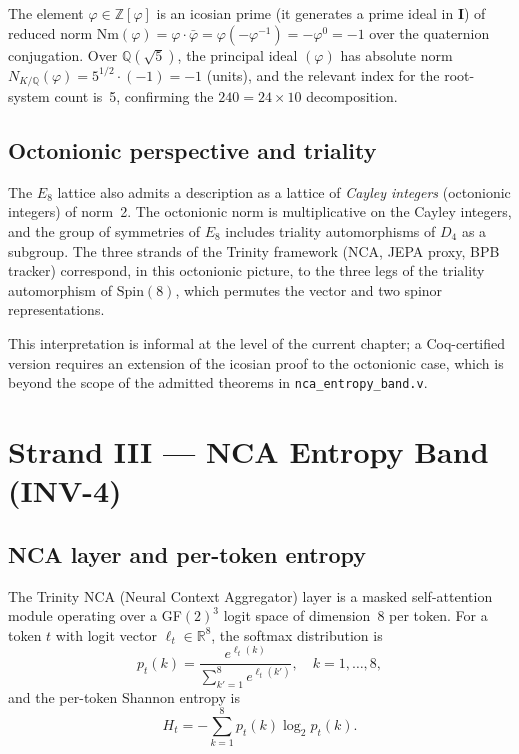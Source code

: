 The element \(\varphi \in \mathbb{Z}[\varphi]\) is an icosian prime
(it generates a prime ideal in \(\mathbf{I}\)) of reduced norm
\(\mathrm{Nm}(\varphi) = \varphi \cdot \bar{\varphi} = \varphi(-\varphi^{-1})
= -\varphi^0 = -1\) over the quaternion conjugation.  Over
\(\mathbb{Q}(\sqrt{5})\), the principal ideal \((\varphi)\) has
absolute norm \(N_{K/\mathbb{Q}}(\varphi) = 5^{1/2} \cdot (-1) = -1\)
(units), and the relevant index for the root-system count is~5,
confirming the \(240 = 24 \times 10\) decomposition.

\subsection{Octonionic perspective and triality}
\label{subsec:strand2-octonion}

The \(E_8\) lattice also admits a description as a lattice of
\emph{Cayley integers} (octonionic integers) of norm~2.  The
octonionic norm is multiplicative on the Cayley integers, and the
group of symmetries of \(E_8\) includes triality automorphisms of
\(D_4\) as a subgroup.  The three strands of the Trinity framework
(NCA, JEPA proxy, BPB tracker) correspond, in this octonionic picture,
to the three legs of the triality automorphism of \(\mathrm{Spin}(8)\),
which permutes the vector and two spinor representations.

This interpretation is informal at the level of the current chapter;
a Coq-certified version requires an extension of the icosian proof
to the octonionic case, which is beyond the scope of the admitted
theorems in \texttt{nca\_entropy\_band.v}.

\section{Strand III — NCA Entropy Band (INV-4)}
\label{sec:e8-strand3}

\subsection{NCA layer and per-token entropy}
\label{subsec:strand3-nca-def}

The Trinity NCA (Neural Context Aggregator) layer is a masked
self-attention module operating over a GF\((2)^3\) logit space of
dimension~8 per token.  For a token \(t\) with logit vector
\(\ell_t \in \mathbb{R}^8\), the softmax distribution is
\[
  p_t(k) = \frac{e^{\ell_t(k)}}{\sum_{k'=1}^{8} e^{\ell_t(k')}},
  \quad k = 1,\ldots,8,
\]
and the per-token Shannon entropy is
\[
  H_t = -\sum_{k=1}^{8} p_t(k) \log_2 p_t(k).
\]

